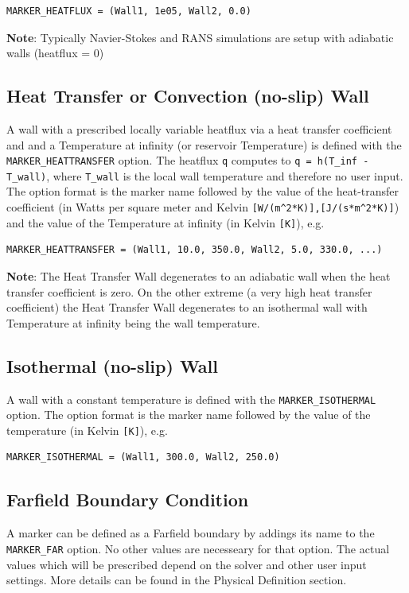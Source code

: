 \documentclass[12pt, a4paper, twoside]{article}
\begin{document}
\begin{lstlisting}
MARKER_HEATFLUX = (Wall1, 1e05, Wall2, 0.0)
\end{lstlisting}

\textbf{Note}: Typically Navier-Stokes and RANS simulations are setup with adiabatic walls (heatflux = 0)

\subsection{Heat Transfer or Convection (no-slip) Wall}
A wall with a prescribed locally variable heatflux via a heat transfer coefficient and and a Temperature at infinity (or reservoir Temperature) is defined with the \texttt{MARKER\_HEATTRANSFER} option. The heatflux \verb|q| computes to \verb|q = h(T_inf - T_wall)|, where \verb|T_wall| is the local wall temperature and therefore no user input. The option format is the marker name followed by the value of the heat-transfer coefficient (in Watts per square meter and Kelvin \verb|[W/(m^2*K)],[J/(s*m^2*K)]|) and the value of the Temperature at infinity (in Kelvin \verb|[K]|), e.g.

\begin{lstlisting}
MARKER_HEATTRANSFER = (Wall1, 10.0, 350.0, Wall2, 5.0, 330.0, ...)

\end{lstlisting}


\textbf{Note}: The Heat Transfer Wall degenerates to an adiabatic wall when the heat transfer coefficient is zero. On the other extreme (a very high heat transfer coefficient) the Heat Transfer Wall degenerates to an isothermal wall with Temperature at infinity being the wall temperature.

\subsection{Isothermal (no-slip) Wall}
A wall with a constant temperature is defined with the \verb|MARKER_ISOTHERMAL| option. The option format is the marker name followed by the value of the temperature (in Kelvin \verb|[K]|), e.g.

\begin{lstlisting}
MARKER_ISOTHERMAL = (Wall1, 300.0, Wall2, 250.0)

\end{lstlisting}

\subsection{Farfield Boundary Condition}
A marker can be defined as a Farfield boundary by addings its name to the \verb|MARKER_FAR| option. No other values are necesseary for that option. The actual values which will be prescribed depend on the solver and other user input settings. More details can be found in the Physical Definition section.
\end{document}
